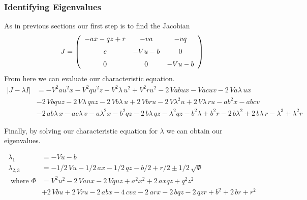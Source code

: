 \documentclass{article}
\begin{document}
\subsubsection{Identifying Eigenvalues}
As in previous sections our first step is to find the Jacobian
\begin{equation}
J = \left( \begin {array}{ccc} -ax-qz+r&-va&-vq\\ \noalign{\medskip}c&-Vu
-b&0\\ \noalign{\medskip}0&0&-Vu-b\end {array} \right) 
\end{equation}
From here we can evaluate our characteristic equation. 
\begin{equation}
	\begin{split}
		|J-\lambda I| &= -{V}^{2}a{u}^{2}x-{V}^{2}q{u}^{2}z-{V}^{2}\lambda\,{u}^{2}+{V}^{2}r{u}
		^{2}-2\,Vabux-Vacuv-2\,Va\lambda\,ux \\
		&-2\,Vbquz-2\,V\lambda\,quz-2\,Vb
		\lambda\,u+2\,Vbru-2\,V{\lambda}^{2}u+2\,V\lambda\,ru-a{b}^{2}x-abcv \\
		&-2\,ab\lambda\,x-ac\lambda\,v-a{\lambda}^{2}x-{b}^{2}qz-2\,b\lambda\,qz-
		{\lambda}^{2}qz-{b}^{2}\lambda+{b}^{2}r-2\,b{\lambda}^{2}+2\,b\lambda
		\,r-{\lambda}^{3}+{\lambda}^{2}r			
	\end{split}
\end{equation}


Finally, by solving our characteristic equation for $\lambda$ we can obtain our eigenvalues.

\begin{equation}
	\begin{split}
		\lambda_1 &= -Vu-b \\
		\lambda_{2,3} &= -1/2\,Vu-1/2\,ax-1/2\,qz-b/2+r/2 \pm 1/2\,\sqrt {\Phi}	\\
		\text{ where } \Phi  &= {V}^{2}{u}^{2}-2\,Vaux-2
		\,Vquz+{a}^{2}{x}^{2}+2\,axqz+{q}^{2}{z}^{2} \\
		&+2\,Vbu+2\,Vru-2\,abx-4\,c
		va-2\,arx-2\,bqz-2\,qzr+{b}^{2}+2\,br+{r}^{2}		
	\end{split}
\end{equation}
\end{document}
